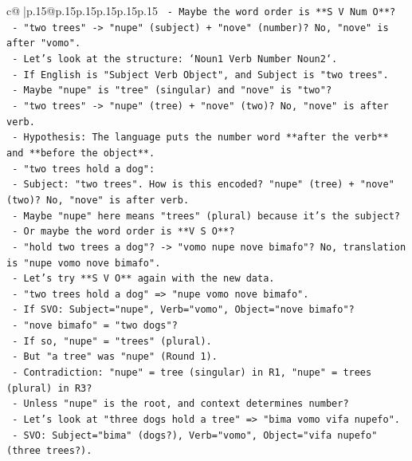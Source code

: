 \documentclass{article}
\begin{document}
{\begin{supertabular}{c@{$\;$}|p{.15\linewidth}@{}p{.15\linewidth}p{.15\linewidth}p{.15\linewidth}p{.15\linewidth}p{.15\linewidth}}
{{{\texttt{       {-} Maybe the word order is **S V Num O**?} \\
\texttt{       {-} "two trees" {-}> "nupe" (subject) + "nove" (number)? No, "nove" is after "vomo".} \\
\texttt{       {-} Let's look at the structure: `Noun1 Verb Number Noun2`.} \\
\texttt{       {-} If English is "Subject Verb Object", and Subject is "two trees".} \\
\texttt{       {-} Maybe "nupe" is "tree" (singular) and "nove" is "two"?} \\
\texttt{       {-} "two trees" {-}> "nupe" (tree) + "nove" (two)? No, "nove" is after verb.} \\
\texttt{       {-} Hypothesis: The language puts the number word **after the verb** and **before the object**.} \\
\texttt{       {-} "two trees hold a dog":} \\
\texttt{         {-} Subject: "two trees". How is this encoded? "nupe" (tree) + "nove" (two)? No, "nove" is after verb.} \\
\texttt{         {-} Maybe "nupe" here means "trees" (plural) because it's the subject?} \\
\texttt{         {-} Or maybe the word order is **V S O**?} \\
\texttt{         {-} "hold two trees a dog"? {-}> "vomo nupe nove bimafo"? No, translation is "nupe vomo nove bimafo".} \\
\texttt{         {-} Let's try **S V O** again with the new data.} \\
\texttt{         {-} "two trees hold a dog" => "nupe vomo nove bimafo".} \\
\texttt{         {-} If SVO: Subject="nupe", Verb="vomo", Object="nove bimafo"?} \\
\texttt{         {-} "nove bimafo" = "two dogs"?} \\
\texttt{         {-} If so, "nupe" = "trees" (plural).} \\
\texttt{         {-} But "a tree" was "nupe" (Round 1).} \\
\texttt{         {-} Contradiction: "nupe" = tree (singular) in R1, "nupe" = trees (plural) in R3?} \\
\texttt{         {-} Unless "nupe" is the root, and context determines number?} \\
\texttt{         {-} Let's look at "three dogs hold a tree" => "bima vomo vifa nupefo".} \\
\texttt{           {-} SVO: Subject="bima" (dogs?), Verb="vomo", Object="vifa nupefo" (three trees?).} \\
}}}
\end{supertabular}}
\end{document}
